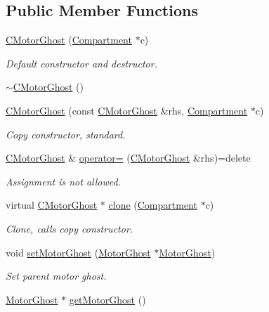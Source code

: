 \subsection*{Public Member Functions}
\begin{DoxyCompactItemize}
\item 
\hyperlink{classCMotorGhost_af158e8f7892b3b283d25a8750539a854}{C\+Motor\+Ghost} (\hyperlink{classCompartment}{Compartment} $\ast$c)
\begin{DoxyCompactList}\small\item\em Default constructor and destructor. \end{DoxyCompactList}\item 
\hyperlink{classCMotorGhost_abb169feb64336df9008c4f736c09a9b4}{$\sim$\+C\+Motor\+Ghost} ()
\item 
\hyperlink{classCMotorGhost_ad36a0bc57074dd813a0bf7ad75c6b0d7}{C\+Motor\+Ghost} (const \hyperlink{classCMotorGhost}{C\+Motor\+Ghost} \&rhs, \hyperlink{classCompartment}{Compartment} $\ast$c)
\begin{DoxyCompactList}\small\item\em Copy constructor, standard. \end{DoxyCompactList}\item 
\hyperlink{classCMotorGhost}{C\+Motor\+Ghost} \& \hyperlink{classCMotorGhost_afee33dd40280b1b63cd918db1de46df8}{operator=} (\hyperlink{classCMotorGhost}{C\+Motor\+Ghost} \&rhs)=delete
\begin{DoxyCompactList}\small\item\em Assignment is not allowed. \end{DoxyCompactList}\item 
virtual \hyperlink{classCMotorGhost}{C\+Motor\+Ghost} $\ast$ \hyperlink{classCMotorGhost_a73ff98b373999b7913d9629ac290240c}{clone} (\hyperlink{classCompartment}{Compartment} $\ast$c)
\begin{DoxyCompactList}\small\item\em Clone, calls copy constructor. \end{DoxyCompactList}\item 
void \hyperlink{classCMotorGhost_a1e18f9a0e0dcc0f2b4b140c3fb60bea8}{set\+Motor\+Ghost} (\hyperlink{classMotorGhost}{Motor\+Ghost} $\ast$\hyperlink{classMotorGhost}{Motor\+Ghost})
\begin{DoxyCompactList}\small\item\em Set parent motor ghost. \end{DoxyCompactList}\item 
\hyperlink{classMotorGhost}{Motor\+Ghost} $\ast$ \hyperlink{classCMotorGhost_a7b5661e4a7bc38ce2657af40b9ff7d29}{get\+Motor\+Ghost} ()

\end{DoxyCompactItemize}
